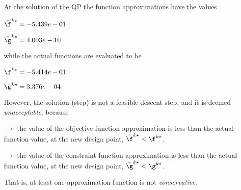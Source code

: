 At the solution of the QP the function approximations have the values

$\tilde \f^{k\star} = -5.439e-01$

$\tilde \g^{k\star} =  4.003e-10$

\bigskip
while the actual functions are evaluated to be

$\f^{k\star} = -5.414e-01$

$\g^{k\star} =  3.376e-04$

\bigskip
 However, the solution (step)                         is not a feasible descent step, and it is deemed                         \emph{unacceptable}, because 
 
$\to$ the value of the objective                             function approximation is less than the actual function                             value, at the new design point,                             $\tilde {\f}^{k\star} < {\f}^{k\star}$.

 $\to$ the value of the constraint function                             approximation is less than the actual function value, at                             the new design point, $\tilde {\g}^{k\star} < {\g}^{k\star}$.

 \bigskip 

 That is, at least one approximation                         function is not \emph{conservative}.
